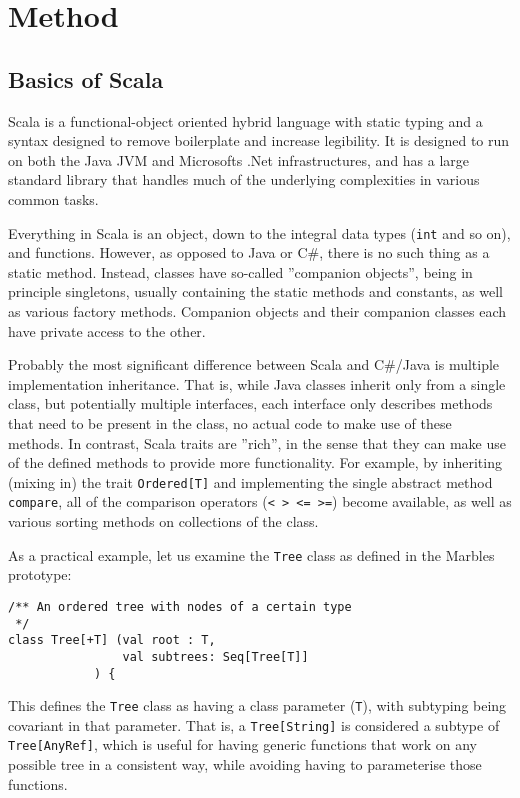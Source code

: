 \section{Method}

\subsection{Basics of Scala}

Scala is a functional-object oriented hybrid language with static typing
and a syntax designed to remove boilerplate and increase legibility. It is
designed to run on both the Java JVM and Microsofts .Net infrastructures,
and has a large standard library that handles much of the underlying
complexities in various common tasks. 

Everything in Scala is an object, down to the integral data types
(\texttt{int} and so on), and functions. However, as opposed to Java or C#,
there is no such thing as a static method. Instead, classes have so-called
''companion objects'', being in principle singletons, usually containing
the static methods and constants, as well as various factory methods.
Companion objects and their companion classes each have private access to
the other.

Probably the most significant difference between Scala and C#/Java is
multiple implementation inheritance. That is, while Java classes inherit
only from a single class, but potentially multiple interfaces, each
interface only describes methods that need to be present in the class, no
actual code to make use of these methods. In contrast, Scala traits are
''rich'', in the sense that they can make use of the defined methods to
provide more functionality. For example, by inheriting (mixing in) the
trait \texttt{Ordered[T]} and implementing the single abstract method
\texttt{compare}, all of the comparison operators (\texttt{< > <= >=})
become available, as well as various sorting methods on collections of the
class.

As a practical example, let us examine the \texttt{Tree} class as defined
in the Marbles prototype:

\begin{verbatim}
/** An ordered tree with nodes of a certain type
 */
class Tree[+T] (val root : T, 
		        val subtrees: Seq[Tree[T]]
			) { 
\end{verbatim}

This defines the \texttt{Tree} class as having a class parameter
(\texttt{T}), with subtyping being covariant in that parameter. That is, a
\texttt{Tree[String]} is considered a subtype of \texttt{Tree[AnyRef]},
which is useful for having generic functions that work on any possible tree
in a consistent way, while avoiding having to parameterise those functions.

